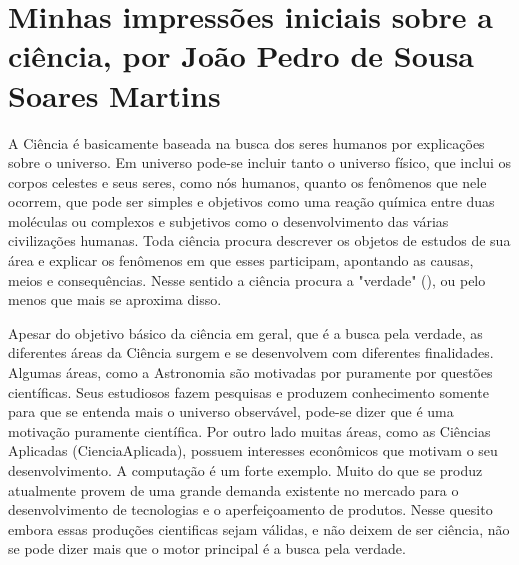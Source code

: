 \section{Minhas impressões iniciais sobre a ciência, por João Pedro de Sousa Soares Martins}



A Ciência é basicamente baseada na busca dos seres humanos por explicações sobre o universo. Em universo pode-se incluir tanto o universo físico, que inclui os corpos celestes e seus seres, como nós humanos, quanto os fenômenos que nele ocorrem, que pode ser simples e objetivos como uma reação química entre duas moléculas ou complexos e subjetivos como o desenvolvimento das várias civilizações humanas. Toda ciência procura descrever os objetos de estudos de sua área e explicar os fenômenos em que esses participam, apontando as causas, meios e consequências. Nesse sentido a ciência procura a "verdade" (\citep{decourt_atividade_2022}), ou pelo menos que mais se aproxima disso.

Apesar do objetivo básico da ciência em geral, que é a busca pela verdade, as diferentes áreas da Ciência surgem e se desenvolvem com diferentes finalidades. Algumas áreas, como a Astronomia são motivadas por puramente por questões científicas. Seus estudiosos fazem pesquisas e produzem conhecimento somente para que se entenda mais o universo observável, pode-se dizer que é uma motivação puramente científica. Por outro lado muitas áreas, como as Ciências Aplicadas (\gls{CienciaAplicada}), possuem interesses econômicos que motivam o seu desenvolvimento. A computação é um forte exemplo. Muito do que se produz atualmente provem de uma grande demanda existente no mercado para o desenvolvimento de tecnologias e o aperfeiçoamento de produtos. Nesse quesito embora essas produções cientificas sejam válidas, e não deixem de ser ciência, não se pode dizer mais que o motor principal é a busca pela verdade. 
